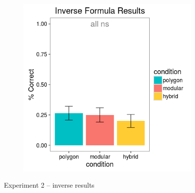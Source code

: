\documentclass[man,10pt]{apa6}
\begin{document}
\begin{figure}[H]
\begin{subfigure}[c]{0.3\textwidth}
\end{subfigure}
~
\begin{subfigure}[c]{0.3\textwidth}
\centering
\includegraphics[width=\textwidth]{figures/2/in_f_r.png}
\end{subfigure}
\caption{Experiment 2 -- inverse results}
\label{ex2_in}
\end{figure} 
\end{document}
